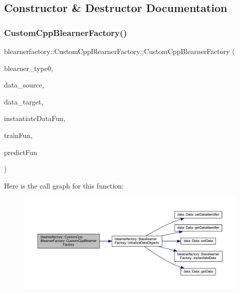 \subsection{Constructor \& Destructor Documentation}
\mbox{\label{classblearnerfactory_1_1_custom_cpp_blearner_factory_a390de0fb001434b3252e5f723c55d7b3}} 
\subsubsection{\texorpdfstring{Custom\+Cpp\+Blearner\+Factory()}{CustomCppBlearnerFactory()}}
{\footnotesize\ttfamily blearnerfactory\+::\+Custom\+Cpp\+Blearner\+Factory\+::\+Custom\+Cpp\+Blearner\+Factory (\begin{DoxyParamCaption}\item[{const std\+::string \&}]{blearner\+\_\+type0,  }\item[{\hyperlink{classdata_1_1_data}{data\+::\+Data} $\ast$}]{data\+\_\+source,  }\item[{\hyperlink{classdata_1_1_data}{data\+::\+Data} $\ast$}]{data\+\_\+target,  }\item[{S\+E\+XP}]{instantiate\+Data\+Fun,  }\item[{S\+E\+XP}]{train\+Fun,  }\item[{S\+E\+XP}]{predict\+Fun }\end{DoxyParamCaption})}

Here is the call graph for this function\+:\nopagebreak
\begin{figure}[H]
\begin{center}
\leavevmode
\includegraphics[width=350pt]{classblearnerfactory_1_1_custom_cpp_blearner_factory_a390de0fb001434b3252e5f723c55d7b3_cgraph}
\end{center}
\end{figure}


